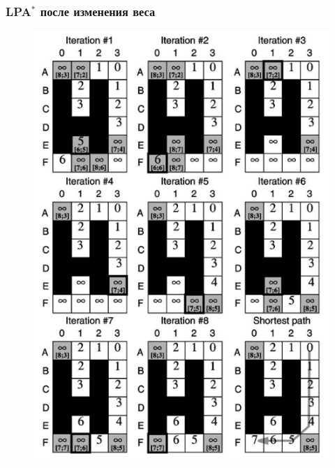 \documentclass{beamer}
\begin{document}
    \begin{frame}
        \frametitle{LPA$^*$ после изменения веса}
        \begin{figure}
            \centering
            \includegraphics[height=.75\textheight]{../figures/rexample-2}
        \end{figure}

    \end{frame}
\end{document}
